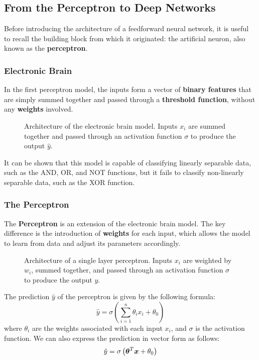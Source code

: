 \subsection{From the Perceptron to Deep Networks}
Before introducing the architecture of a feedforward neural network, it is useful to recall the
building block from which it originated: the artificial neuron, also known as the \textbf{perceptron}.

\subsubsection{Electronic Brain}
In the first perceptron model, the inputs form a vector of \textbf{binary features} that are simply summed together and passed through a \textbf{threshold function},
without any \textbf{weights} involved.
\begin{figure}[H]
    \centering
    \scalebox{0.8}{
        
    }
    \caption{Architecture of the electronic brain model. Inputs $x_i$ are summed together and passed through an activation function $\sigma$ to produce the output $\hat{y}$.}
    \label{fig:electronic_brain}
\end{figure}
It can be shown that this model is capable of classifying linearly separable data, such as the AND, OR, and NOT functions, but it fails to classify non-linearly separable data, such as the XOR function.

\subsubsection{The Perceptron}
The \textbf{Perceptron} is an extension of the electronic brain model.
The key difference is the introduction of \textbf{weights} for each input, which allows the model to learn from data and adjust its parameters accordingly.
\begin{figure}[H]
    \centering
    \scalebox{0.8}{
        
    }
    \caption{Architecture of a single layer perceptron. Inputs $x_i$ are weighted by $w_i$, summed together, and passed through an activation function $\sigma$ to produce the output $y$.}
    \label{fig:single_perceptron}
\end{figure}
The prediction $\hat{y}$ of the perceptron is given by the following formula:
\begin{equation}
    \hat{y} = \sigma\left(\sum_{i=1}^{n} \theta_i x_i + \theta_0\right)
\end{equation}
where $\theta_i$ are the weights associated with each input $x_i$, and $\sigma$ is the activation function.
We can also express the prediction in vector form as follows:
\begin{equation}
    \hat{y} = \sigma\left(\boldsymbol{\theta}^T \boldsymbol{x} + \theta_0\right)
\end{equation}

